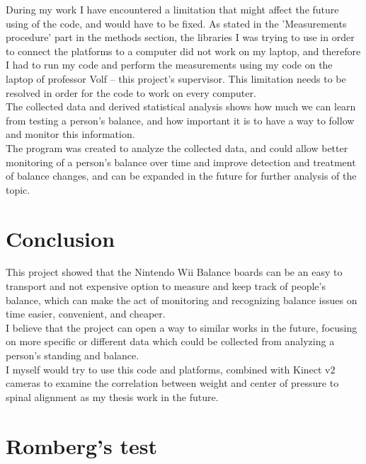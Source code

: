\documentclass[twoside]{ctuthesis}
\theoremstyle{plain}
\theoremstyle{definition}
\theoremstyle{note}
\begin{document}
During my work I have encountered a limitation that might affect the future using of the code, and would have to be fixed. As stated in the 'Measurements procedure' part in the methods section, the libraries I was trying to use in order to connect the platforms to a computer did not work on my laptop, and therefore I had to run my code and perform the measurements using my code on the laptop of professor Volf – this project's supervisor. This limitation needs to be resolved in order for the code to work on every computer.\\
The collected data and derived statistical analysis shows how much we can learn from testing a person's balance, and how important it is to have a way to follow and monitor this information.\\
The program was created to analyze the collected data, and could allow better monitoring of a person's balance over time and improve detection and treatment of balance changes, and can be expanded in the future for further analysis of the topic.\\

\pagebreak

\begingroup
\renewcommand{\cleardoublepage}{}
\renewcommand{\clearpage}{}
\chapter{Conclusion}
\endgroup

This project showed that the Nintendo Wii Balance boards can be an easy to transport and not expensive option to measure and keep track of people's balance, which can make the act of monitoring and recognizing balance issues on time easier, convenient, and cheaper.\\
I believe that the project can open a way to similar works in the future, focusing on more specific or different data which could be collected from analyzing a person's standing and balance.\\
I myself would try to use this code and platforms, combined with Kinect v2 cameras to examine the correlation between weight and center of pressure to spinal alignment as my thesis work in the future.


\appendix


\chapter{Romberg's test}
\end{document}
